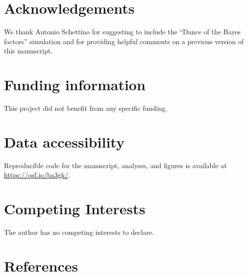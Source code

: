 \documentclass[
  english,
  man, donotrepeattitle,floatsintext]{apa6}
\begin{document}
\hypertarget{acknowledgements}{%
\section*{Acknowledgements}\label{acknowledgements}}

We thank Antonio Schettino for suggesting to include the ``Dance of the Bayes factors'' simulation and for providing helpful comments on a previous version of this manuscript.

\hypertarget{funding-information}{%
\section{Funding information}\label{funding-information}}

This project did not benefit from any specific funding.

\hypertarget{supp}{%
\section{Data accessibility}\label{supp}}

Reproducible code for the manuscript, analyses, and figures is available at \url{https://osf.io/ba3gk/}.

\hypertarget{competing-interests}{%
\section{Competing Interests}\label{competing-interests}}

The author has no competing interests to declare.

\hypertarget{references}{%
\section*{References}\label{references}}
\end{document}
